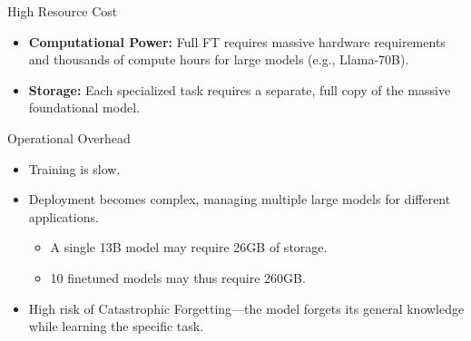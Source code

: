 \documentclass[24pt]{beamer}
\begin{document}
\begin{frame}{High Resource Cost}
    \begin{itemize}
            \item \textbf{Computational Power:} Full FT requires
            \alert{massive hardware requirements} and
            \alert{thousands of compute hours} for large models (e.g.,
            Llama-70B).

            \item \textbf{Storage:} Each specialized task requires a
            separate, full copy of the massive foundational model.
    \end{itemize}
\end{frame}

\begin{frame}{Operational Overhead}
    \begin{itemize}
      
            \item Training is \alert{slow}. \item Deployment becomes
            complex, managing \alert{multiple large models} for different
            applications.
            \begin{itemize}
                \item A single 13B model may require 26GB of storage. \item
                10 finetuned models may thus require 260GB.
            \end{itemize}
            \item High risk of \alert{Catastrophic Forgetting}---the model
            forgets its general knowledge while learning the specific task.
    \end{itemize}
\end{frame}
\end{document}
